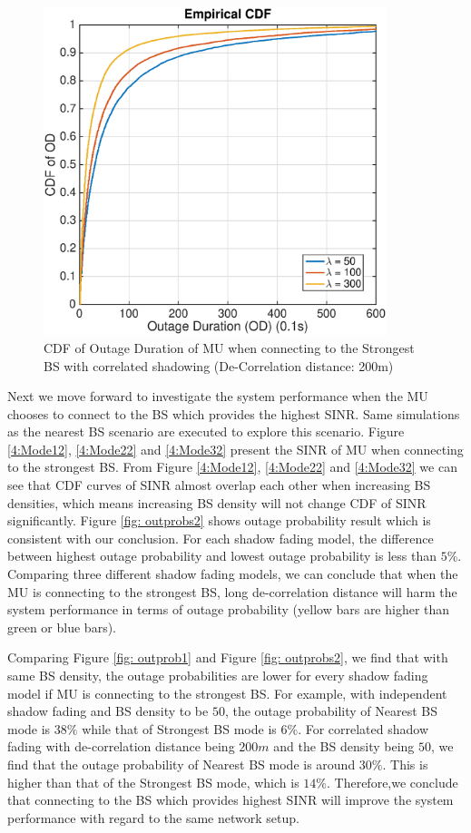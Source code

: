  \begin{figure}
 \centering
 \includegraphics[width=10cm]{ODthresh-5DeCorr200Max.eps}
 \caption{CDF of Outage Duration of MU when connecting to the Strongest BS with correlated shadowing (De-Correlation distance: 200m)}
 \label{corr2}
 \end{figure}
 \par Next we move forward to investigate the system performance when the MU chooses to connect to the BS which provides the highest SINR. Same simulations as the nearest BS scenario are executed to explore this scenario. Figure \ref{4:Mode12}, \ref{4:Mode22} and \ref{4:Mode32} present the SINR of MU when connecting to the strongest BS. From Figure \ref{4:Mode12}, \ref{4:Mode22} and \ref{4:Mode32} we can see that CDF curves of SINR almost overlap each other when increasing BS densities, which means increasing BS density will not change CDF of SINR significantly. Figure \ref{fig: outprobs2} shows outage probability result which is consistent with our conclusion. For each shadow fading model, the difference between highest outage probability and lowest outage probability is less than $5\%$. Comparing three different shadow fading models, we can conclude that when the MU is connecting to the strongest BS, long de-correlation distance will harm the system performance in terms of outage probability (yellow bars are higher than green or blue bars). 
 \par Comparing Figure \ref{fig: outprob1} and Figure \ref{fig: outprobs2}, we find that with same BS density, the outage probabilities are lower for every shadow fading model if MU is connecting to the strongest BS. For example, with independent shadow fading and BS density to be $50$, the outage probability of Nearest BS mode is $38\%$ while that of Strongest BS mode is $6\%$. For correlated shadow fading with de-correlation distance being $200m$ and the BS density being $50$, we find that the outage probability of Nearest BS mode is around $30\%$. This is higher than that of the Strongest BS mode, which is $14\%$. Therefore,we conclude that connecting to the BS which provides highest SINR will improve the system performance with regard to the same network setup. 








